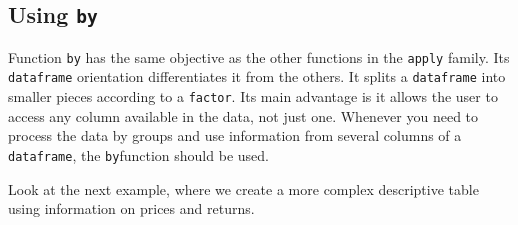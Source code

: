\documentclass[11pt,]{book}
\newenvironment{Shaded}{\begin{snugshade}}{\end{snugshade}}
\newcommand{\KeywordTok}[1]{\textcolor[rgb]{0.27,0.27,0.27}{\textbf{#1}}}
\newcommand{\DataTypeTok}[1]{\textcolor[rgb]{0.27,0.27,0.27}{#1}}
\newcommand{\StringTok}[1]{\textcolor[rgb]{0.5,0.5,0.5}{#1}}
\newcommand{\CommentTok}[1]{\textcolor[rgb]{0.56,0.35,0.01}{\textit{#1}}}
\newcommand{\ControlFlowTok}[1]{\textcolor[rgb]{0.13,0.29,0.53}{\textbf{#1}}}
\newcommand{\OperatorTok}[1]{\textcolor[rgb]{0.81,0.36,0.00}{\textbf{#1}}}
\newcommand{\NormalTok}[1]{#1}
\begin{document}
\subsection{\texorpdfstring{Using
\texttt{by}}{Using by}}\label{using-by}

Function \texttt{by} has the same objective as the other functions in
the \texttt{apply} family. Its \texttt{dataframe} orientation
differentiates it from the others. It splits a \texttt{dataframe} into
smaller pieces according to a \texttt{factor}. Its main advantage is it
allows the user to access any column available in the data, not just
one. Whenever you need to process the data by groups and use information
from several columns of a \texttt{dataframe}, the \texttt{by}function
should be used.

Look at the next example, where we create a more complex descriptive
table using information on prices and returns.

\begin{Shaded}
\end{Shaded}
\end{document}
